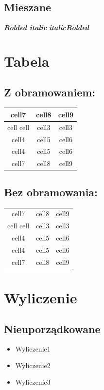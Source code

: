 \documentclass{report}
\begin{document}
        \subsection{Mieszane}
            \textbf{\textit{Bolded italic}}
            \newline
            \textit{\textbf{italicBolded}}

    \section{Tabela}
        \subsection{Z obramowaniem:}
            \begin{tabular}{| c | c | c |}
                \hline
                cell7 & cell8 & cell9\\
                \hline
                cell cell & cell3 & cell3 \\
                \hline
                cell4 & cell5 & cell6 \\
                \hline
                cell4 & cell5 & cell6 \\
                \hline
                cell7 & cell8 & cell9
            \end{tabular}

        \subsection{Bez obramowania:}
            \begin{tabular}{c c c}
                cell7 & cell8 & cell9\\
                cell cell & cell3 & cell3 \\
                cell4 & cell5 & cell6 \\
                cell4 & cell5 & cell6 \\
                cell7 & cell8 & cell9  
            \end{tabular}

    \section{Wyliczenie}
        \subsection{Nieuporządkowane}
            \begin{itemize}
                \item Wyliczenie1
                \item Wyliczenie2
                \item Wyliczenie3
            \end{itemize}
\end{document}
